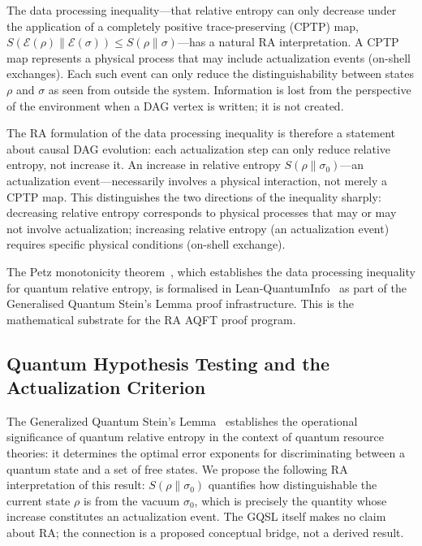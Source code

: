 \documentclass[11pt,a4paper]{article}
\theoremstyle{plain}
\theoremstyle{definition}
\theoremstyle{remark}
\begin{document}
The data processing inequality---that relative entropy can only decrease under the
application of a completely positive trace-preserving (CPTP) map,
$S(\mathcal{E}(\rho) \| \mathcal{E}(\sigma)) \leq S(\rho \| \sigma)$---has a
natural RA interpretation. A CPTP map represents a physical process that may
include actualization events (on-shell exchanges). Each such event can only reduce
the distinguishability between states $\rho$ and $\sigma$ as seen from outside the
system. Information is lost from the perspective of the environment when a DAG
vertex is written; it is not created.

The RA formulation of the data processing inequality is therefore a statement about
causal DAG evolution: each actualization step can only reduce relative entropy, not
increase it. An increase in relative entropy $S(\rho \| \sigma_0)$---an
actualization event---necessarily involves a physical interaction, not merely a
CPTP map. This distinguishes the two directions of the inequality sharply:
decreasing relative entropy corresponds to physical processes that may or may not
involve actualization; increasing relative entropy (an actualization event) requires
specific physical conditions (on-shell exchange).

The Petz monotonicity theorem~\citep{Petz1986}, which establishes the data
processing inequality for quantum relative entropy, is formalised in
Lean-QuantumInfo~\citep{Meiburg2025LQI} as part of the Generalised Quantum
Stein's Lemma proof infrastructure. This is the mathematical substrate for the
RA AQFT proof program.

\subsection{Quantum Hypothesis Testing and the Actualization Criterion}

The Generalized Quantum Stein's Lemma~\citep{Meiburg2025LQI} establishes the
operational significance of quantum relative entropy in the context of quantum
resource theories: it determines the optimal error exponents for discriminating
between a quantum state and a set of free states. We propose the following RA
interpretation of this result: $S(\rho \| \sigma_0)$ quantifies how distinguishable
the current state $\rho$ is from the vacuum $\sigma_0$, which is precisely the
quantity whose increase constitutes an actualization event. The GQSL itself makes
no claim about RA; the connection is a proposed conceptual bridge, not a derived
result.
\end{document}
